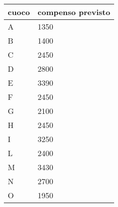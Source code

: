 \documentclass[../modello-progetto.tex]{subfiles}
\begin{document}
\begin{center}
	\begin{tabular}{p{1cm} | p{3cm}}
	\hline
	  cuoco & compenso previsto\\
	\hline
	\hline
	  A & \hfil1350\\
	  B & \hfil1400\\
	  C & \hfil2450 \\
	  D & \hfil2800 \\
	  E & \hfil3390 \\
	  F & \hfil2450 \\
	  G & \hfil2100 \\
	  H & \hfil2450 \\
	  I & \hfil3250 \\
	  L & \hfil2400 \\
	  M & \hfil3430 \\
	  N & \hfil2700 \\
	  O & \hfil1950 \\
	\hline
	\end{tabular}
\end{center}
\end{document}
